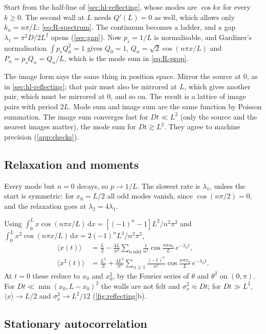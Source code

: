 \documentclass[11pt]{article}
\numberwithin{equation}{section}
\newcommand{\dd}{\mathrm{d}}
\newcommand{\avg}[1]{\langle #1\rangle}
\newcommand{\nodd}{\sum_{n\ \mathrm{odd}}}
\begin{document}
Start from the half-line of \cref{sec:hl-reflecting}, whose modes are $\cos kx$ for every $k\ge0$. The second
wall at $L$ needs $Q'(L)=0$ as well, which allows only $k_n=n\pi/L$: \cref{eq:R-spectrum}. The continuum
becomes a ladder, and a gap $\lambda_1=\pi^2D/2L^2$ opens (\cref{sec:gap}). Now $p_s=1/L$ is normalisable, and
Gardiner's normalisation $\int p_sQ_n^2=1$ gives $Q_0=1$, $Q_n=\sqrt2\cos(n\pi x/L)$ and $P_n=p_sQ_n=Q_n/L$, which
is the mode sum in \cref{eq:R-prop}.

The image form says the same thing in position space. Mirror the source at $0$, as in
\cref{sec:hl-reflecting}; that pair must also be mirrored at $L$, which gives another pair, which must be
mirrored at $0$, and so on. The result is a lattice of image pairs with period $2L$. Mode sum and image sum
are the same function by Poisson summation. The image sum converges fast for $Dt\ll L^2$ (only the source and the
nearest images matter), the mode sum for $Dt\gtrsim L^2$. They agree to machine precision (\cref{app:checks}).

\subsection{Relaxation and moments}

Every mode but $n=0$ decays, so $p\to1/L$. The slowest rate is $\lambda_1$, unless the start is symmetric:
for $x_0=L/2$ all odd modes vanish, since $\cos(n\pi/2)=0$, and the relaxation goes at $\lambda_2=4\lambda_1$.

Using $\int_0^Lx\cos(n\pi x/L)\,\dd x=[(-1)^n-1]L^2/n^2\pi^2$ and
$\int_0^Lx^2\cos(n\pi x/L)\,\dd x=2(-1)^nL^3/n^2\pi^2$,
\begin{align}
  \avg{x(t)} &= \frac L2-\frac{4L}{\pi^2}\nodd\frac{1}{n^2}\cos\frac{n\pi x_0}{L}\,e^{-\lambda_nt}, \\
  \avg{x^2(t)} &= \frac{L^2}{3}+\frac{4L^2}{\pi^2}\sum_{n\ge1}\frac{(-1)^n}{n^2}\cos\frac{n\pi x_0}{L}\,e^{-\lambda_nt}.
\end{align}
At $t=0$ these reduce to $x_0$ and $x_0^2$, by the Fourier series of $\theta$ and $\theta^2$ on $(0,\pi)$.
For $Dt\ll\min(x_0,L-x_0)^2$ the walls are not felt and $\sigma_x^2\approx Dt$; for $Dt\gg L^2$,
$\avg x\to L/2$ and $\sigma_x^2\to L^2/12$ (\cref{fig:reflecting}b).

\subsection{Stationary autocorrelation}
\end{document}
